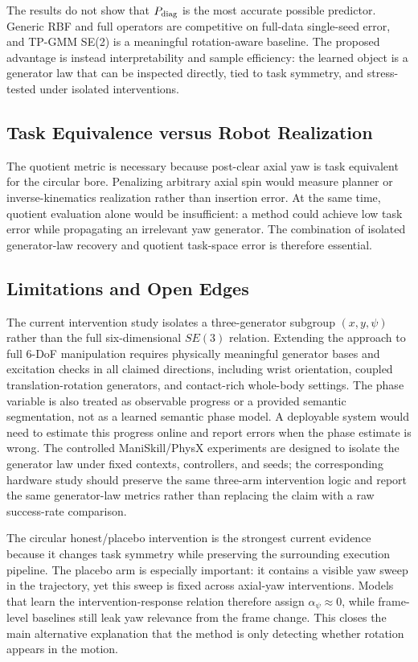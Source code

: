 \documentclass[letterpaper,10pt,conference]{ieeeconf}
\begin{document}
The results do not show that $P_{\rm diag}$ is the most accurate possible
predictor. Generic RBF and full operators are competitive on full-data
single-seed error, and TP-GMM SE(2) is a meaningful rotation-aware baseline.
The proposed advantage is instead interpretability and sample efficiency: the
learned object is a generator law that can be inspected directly, tied to task
symmetry, and stress-tested under isolated interventions.

\subsection{Task Equivalence versus Robot Realization}

The quotient metric is necessary because post-clear axial yaw is task
equivalent for the circular bore. Penalizing arbitrary axial spin would measure
planner or inverse-kinematics realization rather than insertion error. At the
same time, quotient evaluation alone would be insufficient: a method could
achieve low task error while propagating an irrelevant yaw generator. The
combination of isolated generator-law recovery and quotient task-space error is
therefore essential.

\subsection{Limitations and Open Edges}

The current intervention study isolates a three-generator subgroup $(x,y,\psi)$
rather than the full six-dimensional $SE(3)$ relation. Extending the approach
to full 6-DoF manipulation requires physically meaningful generator bases and
excitation checks in all claimed directions, including wrist orientation,
coupled translation-rotation generators, and contact-rich whole-body settings.
The phase variable is also treated as observable progress or a provided
semantic segmentation, not as a learned semantic phase model. A deployable
system would need to estimate this progress online and report errors when the
phase estimate is wrong. The controlled ManiSkill/PhysX experiments are
designed to isolate the generator law under fixed contexts, controllers, and
seeds; the corresponding hardware study should preserve the same three-arm
intervention logic and report the same generator-law metrics rather than
replacing the claim with a raw success-rate comparison.

The circular honest/placebo intervention is the strongest current evidence
because it changes task symmetry while preserving the surrounding execution
pipeline. The placebo arm is especially important: it contains a visible yaw
sweep in the trajectory, yet this sweep is fixed across axial-yaw interventions.
Models that learn the intervention-response relation therefore assign
$\alpha_\psi\approx0$, while frame-level baselines still leak yaw relevance
from the frame change. This closes the main alternative explanation that the
method is only detecting whether rotation appears in the motion.
\end{document}
